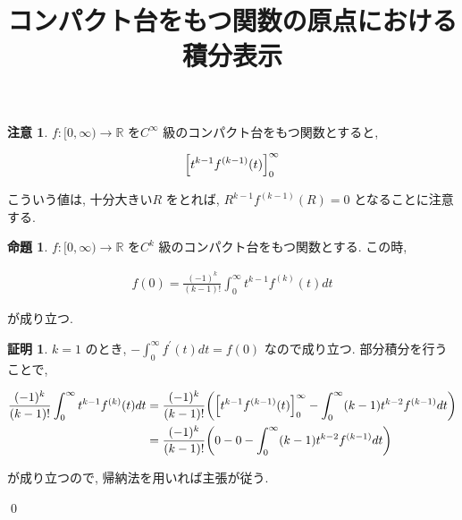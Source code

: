 \documentclass[10pt, fleqn, label-section=none]{bxjsarticle}
\title{コンパクト台をもつ関数の原点における積分表示}
\date{}
\author{}
\theoremstyle{definition}
\newtheorem{prop}[dfn]{命題}
\newtheorem*{pf*}{証明}
\newtheorem{remark}[dfn]{注意}
\newcommand{\paren}[1]{\mleft( #1\mright )}
\newcommand{\sbra}[1]{\mleft\lbrack#1\mright\rbrack}
\renewcommand{\;}{\, ; \,}
\begin{document}
\maketitle

\section{}

\begin{remark}$f: \mathbb [0, \infty) \rightarrow \mathbb R$ を$C^\infty $ 級のコンパクト台をもつ関数とすると, 

\begin{align*}\sbra{t^{k-1} f^{(k-1)} (t)  }_0^\infty  \end{align*}

こういう値は, 十分大きい$R$ をとれば, $R^{k-1} f^(k-1) (R) = 0$ となることに注意する. 

\end{remark}


\begin{prop}$f: \mathbb [0, \infty) \rightarrow \mathbb R$ を$C^k$ 級のコンパクト台をもつ関数とする. この時, 

\begin{align*} f(0) = \frac{(-1)^k }{(k-1)!} \int_0^\infty t^{k-1}f^{(k)} (t) d t \end{align*}

が成り立つ. 

\end{prop}
\begin{pf*}$k = 1$ のとき, $- \int_0^\infty f^\prime (t) dt = f(0)$ なので成り立つ. 部分積分を行うことで, 

\begin{align*} \frac{(-1)^k }{(k-1)!} \int_0^\infty t^{k-1}f^{(k)} (t) d t &= \frac{(-1)^k}{(k-1)!} \paren{ \sbra{t^{k-1} f^{(k-1)} (t)  }_0^\infty  - \int_0^\infty (k-1) t^{k-2}f^{(k-1)} dt }
\\&= \frac{(-1)^k}{(k-1)!} \paren{ 0 - 0  - \int_0^\infty (k-1) t^{k-2}f^{(k-1)} dt }  \end{align*}

が成り立つので, 帰納法を用いれば主張が従う. 

\qed
\end{pf*}
\end{document}
